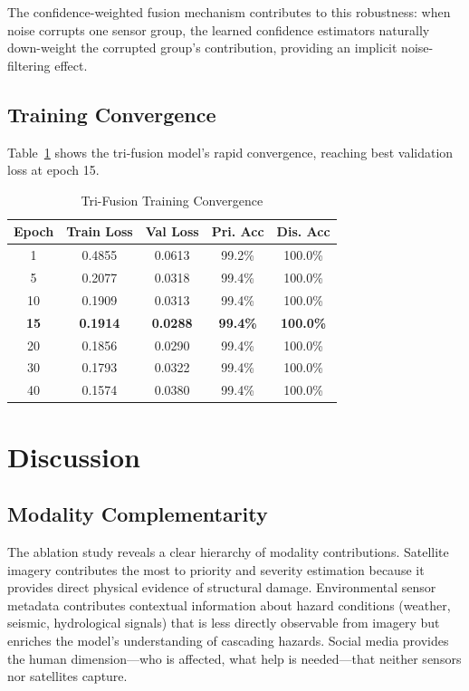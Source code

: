 \documentclass[journal]{IEEEtran}
\begin{document}
The confidence-weighted fusion mechanism contributes to this robustness: when noise corrupts one sensor group, the learned confidence estimators naturally down-weight the corrupted group's contribution, providing an implicit noise-filtering effect.

\subsection{Training Convergence}

Table~\ref{tab:convergence} shows the tri-fusion model's rapid convergence, reaching best validation loss at epoch 15.

\begin{table}[!t]
\centering
\caption{Tri-Fusion Training Convergence}
\label{tab:convergence}
\begin{tabular}{ccccc}
\toprule
\textbf{Epoch} & \textbf{Train Loss} & \textbf{Val Loss} & \textbf{Pri. Acc} & \textbf{Dis. Acc} \\
\midrule
1  & 0.4855 & 0.0613 & 99.2\% & 100.0\% \\
5  & 0.2077 & 0.0318 & 99.4\% & 100.0\% \\
10 & 0.1909 & 0.0313 & 99.4\% & 100.0\% \\
\textbf{15} & \textbf{0.1914} & \textbf{0.0288} & \textbf{99.4\%} & \textbf{100.0\%} \\
20 & 0.1856 & 0.0290 & 99.4\% & 100.0\% \\
30 & 0.1793 & 0.0322 & 99.4\% & 100.0\% \\
40 & 0.1574 & 0.0380 & 99.4\% & 100.0\% \\
\bottomrule
\end{tabular}
\end{table}

\section{Discussion}

\subsection{Modality Complementarity}

The ablation study reveals a clear hierarchy of modality contributions. Satellite imagery contributes the most to priority and severity estimation because it provides direct physical evidence of structural damage. Environmental sensor metadata contributes contextual information about hazard conditions (weather, seismic, hydrological signals) that is less directly observable from imagery but enriches the model's understanding of cascading hazards. Social media provides the human dimension---who is affected, what help is needed---that neither sensors nor satellites capture.
\end{document}
